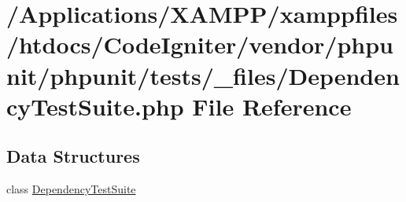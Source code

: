 \hypertarget{_dependency_test_suite_8php}{}\section{/\+Applications/\+X\+A\+M\+P\+P/xamppfiles/htdocs/\+Code\+Igniter/vendor/phpunit/phpunit/tests/\+\_\+files/\+Dependency\+Test\+Suite.php File Reference}
\label{_dependency_test_suite_8php}
\subsection*{Data Structures}
\begin{DoxyCompactItemize}
\item 
class \mbox{\hyperlink{class_dependency_test_suite}{Dependency\+Test\+Suite}}
\end{DoxyCompactItemize}

